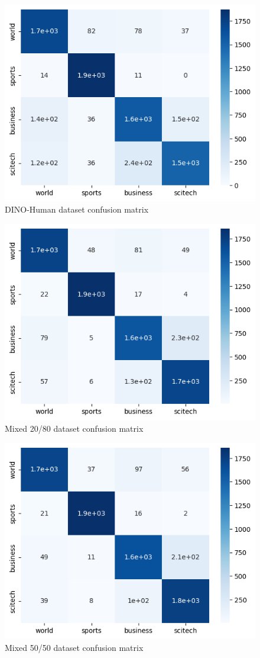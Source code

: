 \documentclass[11pt]{article}
\begin{document}
\begin{figure}[h]
    \centering
    \includegraphics[width=0.8\linewidth]{figures/cm_human.png}
    \caption{DINO-Human dataset confusion matrix}
\end{figure}
\begin{figure}[h]
    \centering
    \includegraphics[width=0.8\linewidth]{figures/cm_mixed_data20.png}
    \caption{Mixed 20/80 dataset confusion matrix}
\end{figure}
\begin{figure}[h]
    \centering
    \includegraphics[width=0.8\linewidth]{figures/cm_mixed_dataset_50.png}
    \caption{Mixed 50/50 dataset confusion matrix}
\end{figure}
\end{document}
